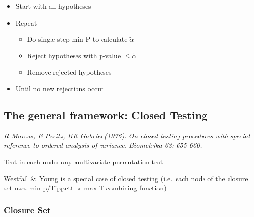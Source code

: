 \documentclass[
]{article}
\providecommand{\tightlist}{%
  \setlength{\itemsep}{0pt}\setlength{\parskip}{0pt}}
\begin{document}
\begin{itemize}
\tightlist
\item
  Start with all hypotheses
\item
  Repeat

  \begin{itemize}
  \tightlist
  \item
    Do single step min-P to calculate \(\tilde\alpha\)\\
  \item
    Reject hypotheses with p-value \(\leq \tilde\alpha\)\\
  \item
    Remove rejected hypotheses\\
  \end{itemize}
\item
  Until no new rejections occur
\end{itemize}

\hypertarget{the-general-framework-closed-testing}{%
\subsection{The general framework: Closed
Testing}\label{the-general-framework-closed-testing}}

\emph{R Marcus, E Peritz, KR Gabriel (1976). On closed testing
procedures with special reference to ordered analysis of variance.
Biometrika 63: 655-660.}

Test in each node: any multivariate permutation test

Westfall \&~Young is a special case of closed testing (i.e.~each node of
the closure set uses min-p/Tippett or max-T combining function)

\hypertarget{closure-set}{%
\subsubsection{Closure Set}\label{closure-set}}
\end{document}
